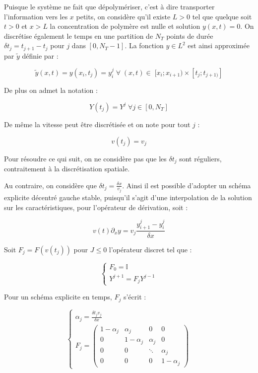\documentclass[a4paper]{article}
\begin{document}
Puisque le système ne fait que dépolymériser, c'est à dire transporter l'information vers les $x$ petits, on considère qu'il existe $L>0$ tel que quelque soit $t>0$ et $x>L$ la concentration de polymère est nulle et solution $y(x,t)=0$. On discrétise également le temps en une partition de $N_T$ points de durée $\delta t_j = t_{j+1} - t_j$ pour $j$ dans $[0,N_T-1]$. La fonction $y \in L^2$ est ainsi approximée par $\tilde{y}$ définie par :

\[ \tilde{y} (x,t) = y(x_i,t_j)=y_i^j \; \forall \; (x,t) \in \; [x_i;x_{i+1}) \times [t_j;t_{j+1)}]\]

De plus on admet la notation :

\[Y(t_j) = Y^j \; \forall j \in [0,N_T] \]

De même la vitesse peut être discrétisée et on note pour tout $j$ :

\[ v(t_j) = v_j \]

Pour résoudre ce qui suit, on ne considère pas que les $\delta t_j$ sont réguliers, contraitement à la discrétisation spatiale.

Au contraire, on considère que $\displaystyle \delta t_j = \frac{\delta x}{v_{j}} $.
Ainsi il est possible d'adopter un schéma explicite décentré gauche stable, puisqu'il s'agit d'une interpolation de la solution sur les caractéristiques, pour l'opérateur de dérivation, soit :

\[ v(t)\partial_x y = v_j \frac{y_{i+1}^j - y_{i}^j}{\delta x} \]

Soit $F_j = F(v(t_j))$ pour $J \leq 0$ l'opérateur discret tel que :

\[ \begin{cases}
F_0 = \mathbb{I} \\
Y^{j+1} = F_j Y^{j-1} 
\end{cases}\]

Pour un schéma explicite en temps, $F_j$ s'écrit :

\[
\begin{cases}
	\alpha_j = \frac{\delta t_j v_{j}}{\delta x}  \\
	 F_j  =\left( \begin{array}{cccc}
	1-\alpha_j &    \alpha_j   &  0     & 0 \\
	0      & 1-\alpha_j   & \alpha_j   & 0 \\
	0      &   0     & \ddots &  \alpha_j \\
	0      & 0       &0        & 1-\alpha_j
	 \end{array} \right)
\end{cases}
\]
\end{document}
